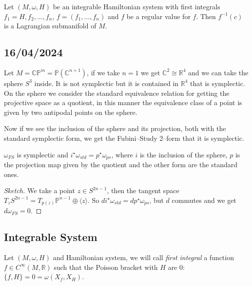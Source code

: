 \documentclass[misc]{subfiles}
\begin{document}
\begin{Nt}
    Let $(M,\omega,H)$ be an integrable Hamiltonian system with first integrals $f_1=H,f_2,\dots,f_n$, $f=(f_1,\dots,f_n)$ and $f$ be a regular value for $f$. Then $f^{-1}(c)$ is a Lagrangian submanifold of $M$.
\end{Nt}


\subsection*{16/04/2024}

\begin{Exp}
    Let $M=\mathbb{C}\mathbb{P}^m=\mathbb{P}(\mathbb{C}^{n+1})$, if we take $n=1$ we get $\mathbb{C}^2 \cong \mathbb{R}^4$ and we can take the sphere $S^3$ inside. It is not symplectic but it is contained in $\mathbb{R}^4$ that is symplectic. On the sphere we consider the standard equivalence relation for getting the projective space as a quotient, in this manner the equivalence class of a point is given by two antipodal points on the sphere.

    Now if we see the inclusion of the sphere and its projection, both with the standard symplectic form, we get the Fubini--Study 2--form that it is symplectic.
\end{Exp}

\begin{Thm}

    $\omega_{FS}$ is symplectic and $i^\star\omega_{std}=p^\star\omega_{ps}$, where $i$ is the inclusion of the sphere, $p$ is the projection map given by the quotient and the other form are the standard ones.

\begin{proof}[Sketch]
    We take a point $z \in S^{2n-1}$, then the tangent space $T_zS^{2n-1}=T_{p(z)}\mathbb{P}^{n-1} \oplus \langle z \rangle$. So $di^\star\omega_{std}=dp^\star\omega_{ps}$, but $d$ commutes and we get $d\omega_{FS}=0$.
\end{proof}

\end{Thm}

\subsection*{Integrable System}

\begin{Dfn}
    Let $(M,\omega,H)$ and Hamiltonian system, we will call \textit{first integral} a function $f \in C^\infty(M,\mathbb{R})$ such that the Poisson bracket with $H$ are 0: $\{f,H\}=0=\omega(X_f,X_H)$.
\end{Dfn}
\end{document}
